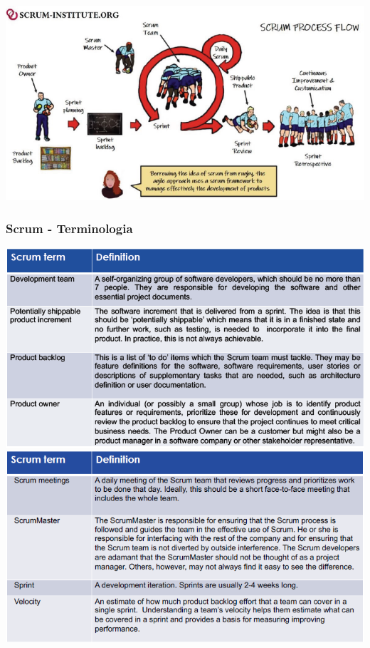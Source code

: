 \documentclass{article}
\begin{document}
\begin{center}
  \includegraphics[scale=0.45]{26}
\end{center}

\pagebreak

\subsubsection{Scrum - Terminologia}

\begin{center}
  \includegraphics[scale=0.45]{27}
  \includegraphics[scale=0.45]{28}
\end{center}
\end{document}

